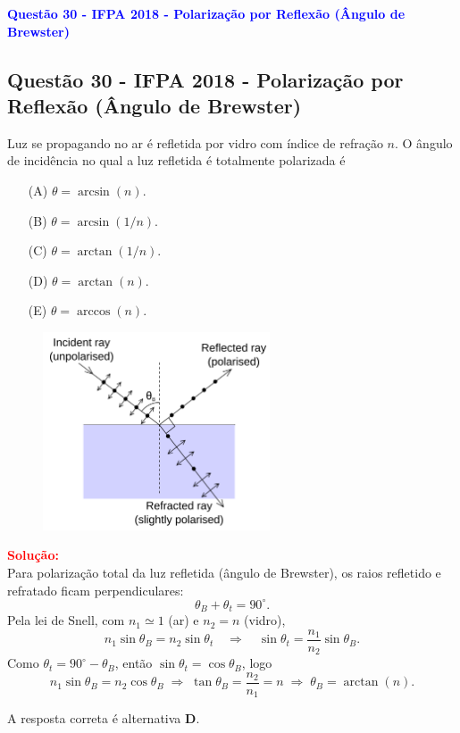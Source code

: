 \begin{flushleft}
\textbf{\textcolor{blue}{\Large Quest\~ao 30 - IFPA 2018 - Polariza\c{c}\~ao por Reflex\~ao (Ângulo de Brewster)}}\\
\noindent

\subsection{Quest\~ao 30 - IFPA 2018 - Polariza\c{c}\~ao por Reflex\~ao (Ângulo de Brewster)}

Luz se propagando no ar é refletida por vidro com índice de refração $n$. O ângulo de incidência no qual a luz refletida é totalmente polarizada é

\begin{itemize}
\item[(A)] $\theta=\arcsin(n)$.
\item[(B)] $\theta=\arcsin(1/n)$.
\item[(C)] $\theta=\arctan(1/n)$.
\item[(D)] $\theta=\arctan(n)$.
\item[(E)] $\theta=\arccos(n)$.
\end{itemize}

\vspace{0.5cm}

\begin{figure}[!h]
\centering
\includegraphics[width=0.6\textwidth]{figures/angulo_brewster.png} 
\end{figure}

\textcolor{red}{\textbf{Solução:}}\\

Para polarização total da luz refletida (ângulo de Brewster), os raios refletido e refratado ficam perpendiculares:
\[
\theta_B+\theta_t=90^\circ.
\]
Pela lei de Snell, com $n_1\simeq 1$ (ar) e $n_2=n$ (vidro),
\[
n_1\sin\theta_B=n_2\sin\theta_t
\quad\Rightarrow\quad
\sin\theta_t=\frac{n_1}{n_2}\sin\theta_B.
\]
Como $\theta_t=90^\circ-\theta_B$, então $\sin\theta_t=\cos\theta_B$, logo
\[
n_1\sin\theta_B=n_2\cos\theta_B
\;\Rightarrow\;
\tan\theta_B=\frac{n_2}{n_1}=n
\;\Rightarrow\;
\theta_B=\arctan(n).
\]

A resposta correta é alternativa \colorbox{green!50}{\textbf{D}}.

\end{flushleft}

